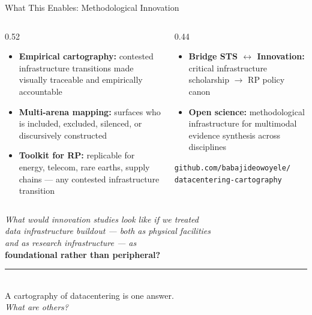 \documentclass[aspectratio=169,12pt]{beamer}
\begin{document}
\begin{frame}{What This Enables: Methodological Innovation}
\begin{columns}[T]
\begin{column}{0.52\textwidth}
  \begin{itemize}\setlength\itemsep{0.4em}
    \item \textbf{Empirical cartography:} contested infrastructure transitions
          made visually traceable and empirically accountable
    \item \textbf{Multi-arena mapping:} surfaces who is included, excluded,
          silenced, or discursively constructed
    \item \textbf{Toolkit for RP:} replicable for energy, telecom, rare earths,
          supply chains — any contested infrastructure transition
  \end{itemize}
\end{column}
\begin{column}{0.44\textwidth}
  \begin{itemize}\setlength\itemsep{0.4em}
    \item \textbf{Bridge STS $\leftrightarrow$ Innovation:} critical
          infrastructure scholarship $\to$ RP policy canon
    \item \textbf{Open science:} methodological infrastructure for multimodal
          evidence synthesis across disciplines
  \end{itemize}
  \vspace{0.5em}
  \footnotesize\textcolor{tufteRule}{%
  \texttt{github.com/babajideowoyele/}\\\texttt{datacentering-cartography}}
\end{column}
\end{columns}
\end{frame}

\begin{frame}[plain]
\vspace{2.5em}
{\large\itshape
What would innovation studies look like if we treated\\[0.4em]
data infrastructure buildout — both as physical facilities\\[0.4em]
and as research infrastructure — as\\[0.6em]}
{\Large\textbf{\alert{foundational} rather than peripheral?}}\\[1.2em]
\textcolor{tufteRule}{\rule{0.5\textwidth}{0.4pt}}\\[0.6em]
{\normalsize A cartography of datacentering is one answer.}\\[0.3em]
{\small\textit{What are others?}}
\end{frame}
\end{document}
